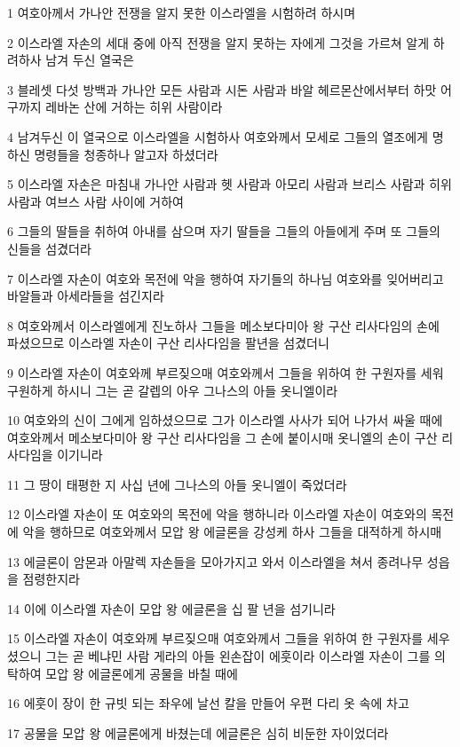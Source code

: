 \par 1 여호아께서 가나안 전쟁을 알지 못한 이스라엘을 시험하려 하시며
\par 2 이스라엘 자손의 세대 중에 아직 전쟁을 알지 못하는 자에게 그것을 가르쳐 알게 하려하사 남겨 두신 열국은
\par 3 블레셋 다섯 방백과 가나안 모든 사람과 시돈 사람과 바알 헤르몬산에서부터 하맛 어구까지 레바논 산에 거하는 히위 사람이라
\par 4 남겨두신 이 열국으로 이스라엘을 시험하사 여호와께서 모세로 그들의 열조에게 명하신 명령들을 청종하나 알고자 하셨더라
\par 5 이스라엘 자손은 마침내 가나안 사람과 헷 사람과 아모리 사람과 브리스 사람과 히위 사람과 여브스 사람 사이에 거하여
\par 6 그들의 딸들을 취하여 아내를 삼으며 자기 딸들을 그들의 아들에게 주며 또 그들의 신들을 섬겼더라
\par 7 이스라엘 자손이 여호와 목전에 악을 행하여 자기들의 하나님 여호와를 잊어버리고 바알들과 아세라들을 섬긴지라
\par 8 여호와께서 이스라엘에게 진노하사 그들을 메소보다미아 왕 구산 리사다임의 손에 파셨으므로 이스라엘 자손이 구산 리사다임을 팔년을 섬겼더니
\par 9 이스라엘 자손이 여호와께 부르짖으매 여호와께서 그들을 위하여 한 구원자를 세워 구원하게 하시니 그는 곧 갈렙의 아우 그나스의 아들 옷니엘이라
\par 10 여호와의 신이 그에게 임하셨으므로 그가 이스라엘 사사가 되어 나가서 싸울 때에 여호와께서 메소보다미아 왕 구산 리사다임을 그 손에 붙이시매 옷니엘의 손이 구산 리사다임을 이기니라
\par 11 그 땅이 태평한 지 사십 년에 그나스의 아들 옷니엘이 죽었더라
\par 12 이스라엘 자손이 또 여호와의 목전에 악을 행하니라 이스라엘 자손이 여호와의 목전에 악을 행하므로 여호와께서 모압 왕 에글론을 강성케 하사 그들을 대적하게 하시매
\par 13 에글론이 암몬과 아말렉 자손들을 모아가지고 와서 이스라엘을 쳐서 종려나무 성읍을 점령한지라
\par 14 이에 이스라엘 자손이 모압 왕 에글론을 십 팔 년을 섬기니라
\par 15 이스라엘 자손이 여호와께 부르짖으매 여호와께서 그들을 위하여 한 구원자를 세우셨으니 그는 곧 베냐민 사람 게라의 아들 왼손잡이 에훗이라 이스라엘 자손이 그를 의탁하여 모압 왕 에글론에게 공물을 바칠 때에
\par 16 에훗이 장이 한 규빗 되는 좌우에 날선 칼을 만들어 우편 다리 옷 속에 차고
\par 17 공물을 모압 왕 에글론에게 바쳤는데 에글론은 심히 비둔한 자이었더라
